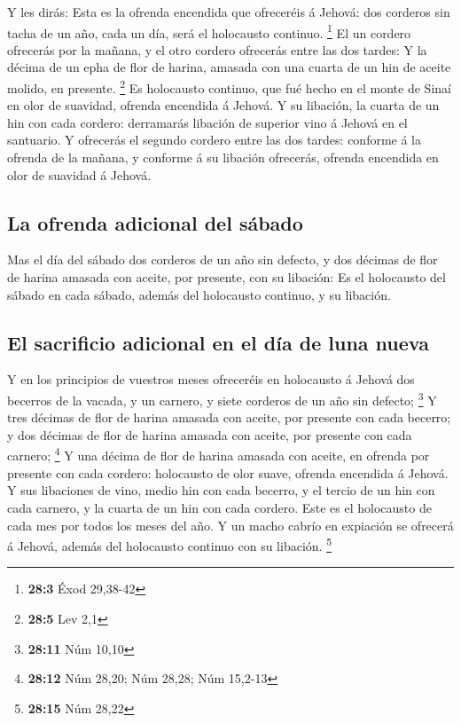  Y les dirás: Esta es la ofrenda encendida que ofreceréis
á Jehová: dos corderos sin tacha de un año, cada un día, será el
holocausto continuo. \footnote{\textbf{28:3} Éxod 29,38-42}
 El un cordero ofrecerás por la mañana, y el otro cordero
ofrecerás entre las dos tardes:  Y la décima de un epha de
flor de harina, amasada con una cuarta de un hin de aceite molido, en
presente. \footnote{\textbf{28:5} Lev 2,1}  Es holocausto
continuo, que fué hecho en el monte de Sinaí en olor de suavidad,
ofrenda encendida á Jehová.  Y su libación, la cuarta de
un hin con cada cordero: derramarás libación de superior vino á Jehová
en el santuario.  Y ofrecerás el segundo cordero entre las
dos tardes: conforme á la ofrenda de la mañana, y conforme á su libación
ofrecerás, ofrenda encendida en olor de suavidad á Jehová.

\hypertarget{la-ofrenda-adicional-del-suxe1bado}{%
\subsection{La ofrenda adicional del
sábado}\label{la-ofrenda-adicional-del-suxe1bado}}

 Mas el día del sábado dos corderos de un año sin defecto,
y dos décimas de flor de harina amasada con aceite, por presente, con su
libación:  Es el holocausto del sábado en cada sábado,
además del holocausto continuo, y su libación.

\hypertarget{el-sacrificio-adicional-en-el-duxeda-de-luna-nueva}{%
\subsection{El sacrificio adicional en el día de luna
nueva}\label{el-sacrificio-adicional-en-el-duxeda-de-luna-nueva}}

 Y en los principios de vuestros meses ofreceréis en
holocausto á Jehová dos becerros de la vacada, y un carnero, y siete
corderos de un año sin defecto; \footnote{\textbf{28:11} Núm 10,10}
 Y tres décimas de flor de harina amasada con aceite, por
presente con cada becerro; y dos décimas de flor de harina amasada con
aceite, por presente con cada carnero; \footnote{\textbf{28:12} Núm
  28,20; Núm 28,28; Núm 15,2-13}  Y una décima de flor de
harina amasada con aceite, en ofrenda por presente con cada cordero:
holocausto de olor suave, ofrenda encendida á Jehová.  Y
sus libaciones de vino, medio hin con cada becerro, y el tercio de un
hin con cada carnero, y la cuarta de un hin con cada cordero. Este es el
holocausto de cada mes por todos los meses del año.  Y un
macho cabrío en expiación se ofrecerá á Jehová, además del holocausto
continuo con su libación. \footnote{\textbf{28:15} Núm 28,22}

